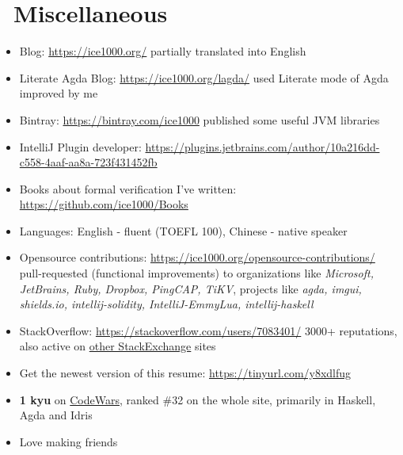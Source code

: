 \documentclass{resume}
\begin{document}
\section{\faInfo\ Miscellaneous}
\begin{itemize}[parsep=0.25ex]
  \item Blog: \url{https://ice1000.org/} partially translated into English
  \item Literate Agda Blog: \url{https://ice1000.org/lagda/} used Literate mode of Agda improved by me
  \item Bintray: \url{https://bintray.com/ice1000} published some useful JVM libraries
  \item IntelliJ Plugin developer: \url{https://plugins.jetbrains.com/author/10a216dd-c558-4aaf-aa8a-723f431452fb}
  \item Books about formal verification I've written: \url{https://github.com/ice1000/Books}
  \item Languages: English - fluent (TOEFL 100), Chinese - native speaker
  \item Opensource contributions: \url{https://ice1000.org/opensource-contributions/} \\
    pull-requested (functional improvements) to organizations like \textit{Microsoft, JetBrains, Ruby, Dropbox, PingCAP, TiKV},
    projects like \textit{agda, imgui, shields.io, intellij-solidity, IntelliJ-EmmyLua, intellij-haskell}
  \item StackOverflow: \url{https://stackoverflow.com/users/7083401/}
    3000+ reputations, also active on \href{https://stackexchange.com/users/9532102/} {other StackExchange} sites
  \item Get the newest version of this resume: \url{https://tinyurl.com/y8xdlfug}
  \item \textbf{1 kyu} on
    \href{https://www.codewars.com/users/ice1000} {CodeWars},
    ranked \#32 on the whole site, primarily in Haskell, Agda and Idris
  \item Love making friends
\end{itemize}

%
%
\end{document}
